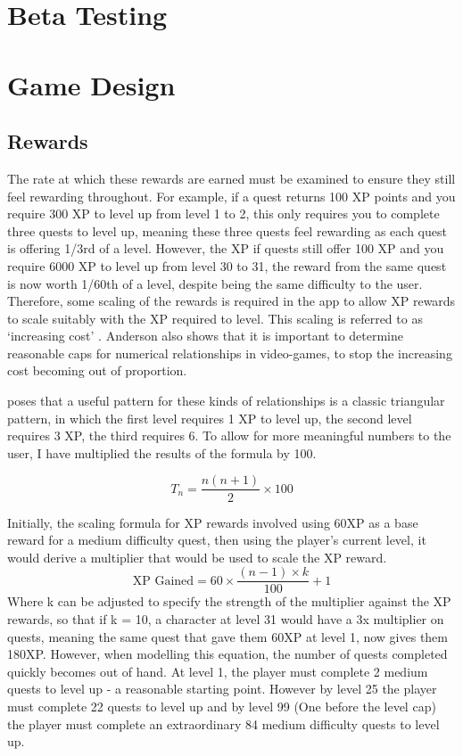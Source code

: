 \section{Beta Testing}

\section{Game Design}

\subsection{Rewards}
The rate at which these rewards are earned must be examined to ensure they still feel rewarding throughout. 
For example, if a quest returns 100 XP points and you require 300 XP to level up from level 1 to 2, this only requires you to complete three quests to level up, meaning these three quests feel rewarding as each quest is offering 1/3rd of a level.
However, the XP if quests still offer 100 XP and you require 6000 XP to level up from level 30 to 31, the reward from the same quest is now worth 1/60th of a level, despite being the same difficulty to the user.
Therefore, some scaling of the rewards is required in the app to allow XP rewards to scale suitably with the XP required to level.
This scaling is referred to as `increasing cost' \citep{1_anderson_2016}.
Anderson also shows that it is important to determine reasonable caps for numerical relationships in video-games, to stop the increasing cost becoming out of proportion.

\cite{1_anderson_2016} poses that a useful pattern for these kinds of relationships is a classic triangular pattern, in which the first level requires 1 XP to level up, the second level requires 3 XP, the third requires 6. To allow for more meaningful numbers to the user, I have multiplied the results of the formula by 100.

\begin{equation} \label{eq:xprequiredfornextlevel}
	T_n= \frac{n(n+1)}{2} \times 100
\end{equation}

Initially, the scaling formula for XP rewards involved using 60XP as a base reward for a medium difficulty quest, then using the player's current level, it would derive a multiplier that would be used to scale the XP reward.
\begin{equation} \label{eq:xpgainedlinear}
	\textrm{XP Gained} = 60 \times \frac{(n - 1) \times k}{100} + 1
\end{equation}
Where k can be adjusted to specify the strength of the multiplier against the XP rewards, so that if k = 10, a character at level 31 would have a 3x multiplier on quests, meaning the same quest that gave them 60XP at level 1, now gives them 180XP.
However, when modelling this equation, the number of quests completed quickly becomes out of hand. 
At level 1, the player must complete 2 medium quests to level up - a reasonable starting point.
However by level 25 the player must complete 22 quests to level up and by level 99 (One before the level cap) the player must complete an extraordinary 84 medium difficulty quests to level up.

